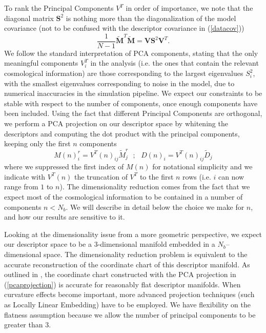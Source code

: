 \documentclass[reprint,aps,prd,superscriptaddress,showkeys,showpacs]{revtex4-1}
\begin{document}
To rank the Principal Components $V^T$ in order of importance, we note that the diagonal matrix $\mathbf{S}^2$ is nothing more than the diagonalization of the model covariance (not to be confused with the descriptor covariance in (\ref{datacov}))
\begin{equation}
\frac{1}{N-1}\mathbf{\tilde{M}}^T\mathbf{\tilde{M}} = \mathbf{V}\mathbf{S}^2\mathbf{V}^T.
\end{equation} 
%
We follow the standard interpretation of PCA components, stating that the only meaningful components $V^T_i$ in the analysis (i.e. the ones that contain the relevant cosmological information) are those corresponding to the largest eigenvalues $S^2_{i}$, with the smallest eigenvalues corresponding to noise in the model, due to numerical inaccuracies in the simulation pipeline. We expect our constraints to be stable with respect to the number of components, once enough components have been included. Using the fact that different Principal Components are orthogonal, we perform a PCA projection on our descriptor space by whitening the descriptors and computing the dot product with the principal components, keeping only the first $n$ components
\begin{equation}
\label{pcaprojection}
M(n)_{i}^r = V^T(n)_{ij}\tilde{M}_j^r \,\,\,\, ; \,\,\,\,  D(n)_i = V^T(n)_{ij}\tilde{D}_j
\end{equation}
%
where we suppressed the first index of $M(n)$ for notational simplicity and we indicate with $V^T(n)$ the truncation of $V^T$ to the first $n$ rows (i.e. $i$ can now range from $1$ to $n$). The dimensionality reduction comes from the fact that we expect most of the cosmological information to be contained in a number of components $n<N_{b}$. We will describe in detail below the choice we make for $n$, and how our results are sensitive to it.

Looking at the dimensionality issue from a more geometric perspective, we expect our descriptor space to be a 3-dimensional manifold embedded in a $N_b$--dimensional space. The dimensionality reduction problem is equivalent to the accurate reconstruction of the coordinate chart of this descriptor manifold. As outlined in \citep{astroMLText}, the coordinate chart constructed with the PCA projection in (\ref{pcaprojection}) is accurate for reasonably flat descriptor manifolds. When curvature effects become important, more advanced projection techniques (such as Locally Linear Embedding) have to be employed. We have flexibility on the flatness assumption because we allow the number of principal components to be greater than 3. 
\end{document}
